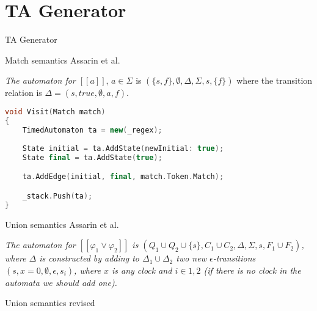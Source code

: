 
\section{TA Generator}
\begin{frame}[shrink=5]{TA Generator}
    \begin{center}
        
    \end{center}
\end{frame}
\begin{frame}[fragile]{Match semantics}
    Assarin et al.

    \textit{The automaton for \underline{$[\![a]\!]$}}, $a\in\Sigma$ is $(\{s,f\},\emptyset,\Delta,\Sigma,s,\{f\})$ where the transition relation is $\Delta={(s,true,\emptyset,a,f)}$.

    \begin{lstlisting}[language=c++,basicstyle=\small]
void Visit(Match match)
{
    TimedAutomaton ta = new(_regex);
    
    State initial = ta.AddState(newInitial: true);
    State final = ta.AddState(true);

    ta.AddEdge(initial, final, match.Token.Match);

    _stack.Push(ta);
}
    \end{lstlisting}
\end{frame}

\begin{frame}{Union semantics}
    Assarin et al.

    \textit{The automaton for $[[\varphi_1\vee\varphi_2]]$ is $(Q_1\cup Q_2 \cup \{s\},C_1\cup C_2,\Delta,\Sigma,s,F_1\cup F_2)$, where $\Delta$ is constructed
        by adding to $\Delta_1\cup \Delta_2$ two new $\epsilon$-transitions $(s, x = 0,\emptyset,\epsilon,s_i)$, where $x$ is any clock and $i\in{1,2}$
        (if there is no clock in the automata we should add one).}

    
    
\end{frame}

\begin{frame}{Union semantics revised}
    
\end{frame}

